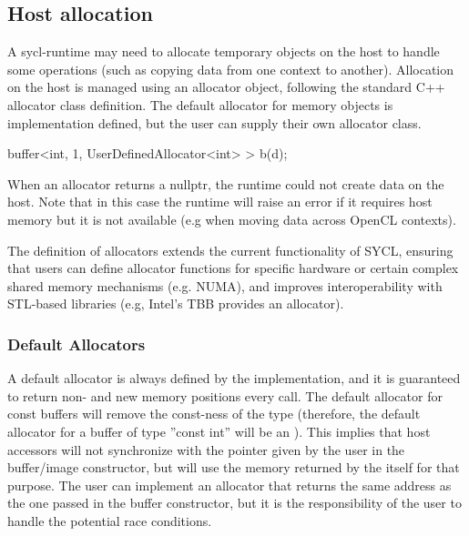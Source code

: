 \subsection{Host allocation}

A \gls{sycl-runtime} may need to allocate temporary objects on the host
to handle some operations (such as copying data from one context to 
another).
Allocation on the host is managed using an allocator object, following the
standard C++ allocator class definition.
The default allocator for memory objects is implementation defined,
but the user can supply their own allocator class.

\begin{code}
{
  buffer<int, 1, UserDefinedAllocator<int> > b(d);
}
\end{code}

When an allocator returns a nullptr, the runtime could not create data on the
host. Note that in this case the runtime will raise an error if it requires
host memory but it is not available (e.g when moving data across OpenCL
contexts).

The definition of allocators extends the current functionality of SYCL,
ensuring that users can define allocator functions for specific hardware or
certain complex shared memory mechanisms (e.g. NUMA), and improves
interoperability with STL-based libraries (e.g, Intel's TBB provides an
allocator).


\subsubsection{Default Allocators}
\label{subsec:default.allocators}
A default allocator is always defined by the implementation, and it is
guaranteed to return non- and new memory positions every call.
The default allocator for const buffers will remove the const-ness of the
type (therefore, the default allocator for a buffer of type ''const int'' will
be an ).
This implies that host \glspl{accessor} will not synchronize with the pointer given
by the user in the buffer/image constructor, but will use the memory
returned by the  itself for that purpose.
The user can implement an allocator that returns the same address as the
one passed in the buffer constructor, but it is the responsibility of the
user to handle the potential race conditions.

